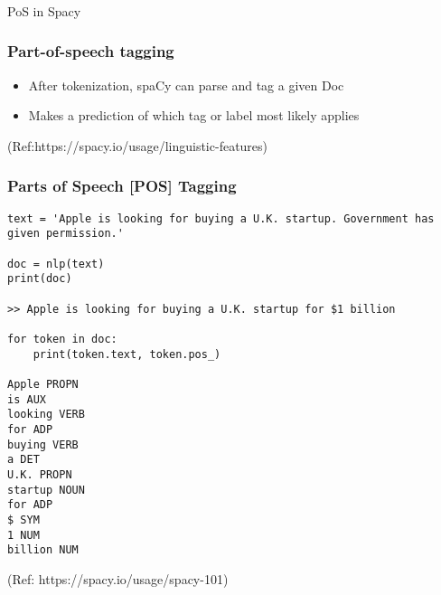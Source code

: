 \begin{frame}[fragile]\frametitle{}

\begin{center}
{\Large PoS in Spacy}
\end{center}
\end{frame}

\begin{frame}[fragile]\frametitle{Part-of-speech tagging}
  \begin{itemize}
    \item After tokenization, spaCy can parse and tag a given Doc
		\item Makes a prediction of which tag or label most likely applies
  \end{itemize}
	
{\tiny (Ref:https://spacy.io/usage/linguistic-features)}
\end{frame}

\begin{frame}[fragile]\frametitle{Parts of Speech [POS] Tagging }

\begin{lstlisting}
text = 'Apple is looking for buying a U.K. startup. Government has given permission.'

doc = nlp(text)
print(doc)

>> Apple is looking for buying a U.K. startup for $1 billion

for token in doc:
    print(token.text, token.pos_)

Apple PROPN
is AUX
looking VERB
for ADP
buying VERB
a DET
U.K. PROPN
startup NOUN
for ADP
$ SYM
1 NUM
billion NUM
\end{lstlisting}
	
{\tiny (Ref: https://spacy.io/usage/spacy-101)}
\end{frame}

